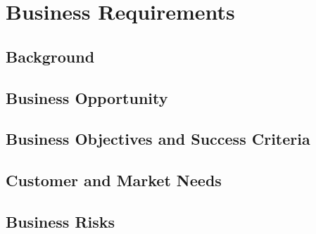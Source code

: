 \section{Business Requirements}
\subsection{Background}

\subsection{Business Opportunity}

\subsection{Business Objectives and Success Criteria}

\subsection{Customer and Market Needs}

\subsection{Business Risks}


